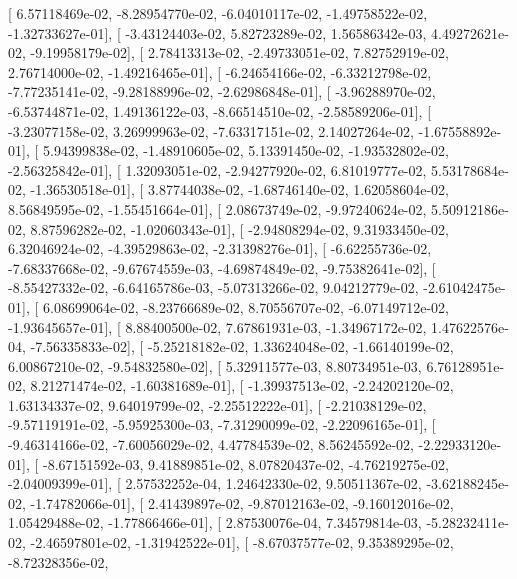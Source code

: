 \documentclass{article}
\begin{document}
       [  6.57118469e-02,  -8.28954770e-02,  -6.04010117e-02,
         -1.49758522e-02,  -1.32733627e-01],
       [ -3.43124403e-02,   5.82723289e-02,   1.56586342e-03,
          4.49272621e-02,  -9.19958179e-02],
       [  2.78413313e-02,  -2.49733051e-02,   7.82752919e-02,
          2.76714000e-02,  -1.49216465e-01],
       [ -6.24654166e-02,  -6.33212798e-02,  -7.77235141e-02,
         -9.28188996e-02,  -2.62986848e-01],
       [ -3.96288970e-02,  -6.53744871e-02,   1.49136122e-03,
         -8.66514510e-02,  -2.58589206e-01],
       [ -3.23077158e-02,   3.26999963e-02,  -7.63317151e-02,
          2.14027264e-02,  -1.67558892e-01],
       [  5.94399838e-02,  -1.48910605e-02,   5.13391450e-02,
         -1.93532802e-02,  -2.56325842e-01],
       [  1.32093051e-02,  -2.94277920e-02,   6.81019777e-02,
          5.53178684e-02,  -1.36530518e-01],
       [  3.87744038e-02,  -1.68746140e-02,   1.62058604e-02,
          8.56849595e-02,  -1.55451664e-01],
       [  2.08673749e-02,  -9.97240624e-02,   5.50912186e-02,
          8.87596282e-02,  -1.02060343e-01],
       [ -2.94808294e-02,   9.31933450e-02,   6.32046924e-02,
         -4.39529863e-02,  -2.31398276e-01],
       [ -6.62255736e-02,  -7.68337668e-02,  -9.67674559e-03,
         -4.69874849e-02,  -9.75382641e-02],
       [ -8.55427332e-02,  -6.64165786e-03,  -5.07313266e-02,
          9.04212779e-02,  -2.61042475e-01],
       [  6.08699064e-02,  -8.23766689e-02,   8.70556707e-02,
         -6.07149712e-02,  -1.93645657e-01],
       [  8.88400500e-02,   7.67861931e-03,  -1.34967172e-02,
          1.47622576e-04,  -7.56335833e-02],
       [ -5.25218182e-02,   1.33624048e-02,  -1.66140199e-02,
          6.00867210e-02,  -9.54832580e-02],
       [  5.32911577e-03,   8.80734951e-03,   6.76128951e-02,
          8.21271474e-02,  -1.60381689e-01],
       [ -1.39937513e-02,  -2.24202120e-02,   1.63134337e-02,
          9.64019799e-02,  -2.25512222e-01],
       [ -2.21038129e-02,  -9.57119191e-02,  -5.95925300e-03,
         -7.31290099e-02,  -2.22096165e-01],
       [ -9.46314166e-02,  -7.60056029e-02,   4.47784539e-02,
          8.56245592e-02,  -2.22933120e-01],
       [ -8.67151592e-03,   9.41889851e-02,   8.07820437e-02,
         -4.76219275e-02,  -2.04009399e-01],
       [  2.57532252e-04,   1.24642330e-02,   9.50511367e-02,
         -3.62188245e-02,  -1.74782066e-01],
       [  2.41439897e-02,  -9.87012163e-02,  -9.16012016e-02,
          1.05429488e-02,  -1.77866466e-01],
       [  2.87530076e-04,   7.34579814e-03,  -5.28232411e-02,
         -2.46597801e-02,  -1.31942522e-01],
       [ -8.67037577e-02,   9.35389295e-02,  -8.72328356e-02,
\end{document}
